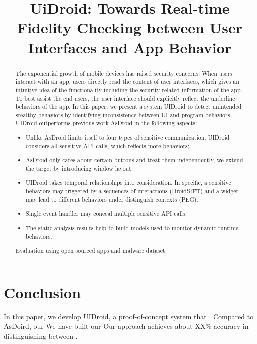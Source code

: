 \documentclass[10pt, conference, letterpaper]{IEEEtran}
\begin{document}
\title{UiDroid: Towards Real-time Fidelity Checking between User Interfaces and App Behavior}

\maketitle


\begin{abstract}
The exponential growth of mobile devices has raised security concerns.
When users interact with an app, users directly read the content of user interfaces, which gives an intuitive idea of the functionality including the security-related information of the app.
To best assist the end users, the user interface should explicitly reflect the underline behaviors of the app.  
In this paper, we present a system UIDroid to detect unintended stealthy behaviors by identifying inconsistence between UI and program behaviors.
UIDroid outperforms previous work AsDroid in the following aspects:
\begin{itemize}
\item Unlike AsDroid limits itself to four types of sensitive communication, UIDroid considers all sensitive API calls, which reflects more behaviors;
\item AsDroid only cares about certain buttons and treat them independently, we extend the target by introducing window layout.
\item UIDroid takes temporal relationships into consideration. In specific, a sensitive behaviors may triggered by a sequences of interactions (DroidSIFT) and a widget may lead to different behaviors under distinguish contexts (PEG);
\item Single event handler may conceal multiple sensitive API calls;
\item The static analysis results help to build models used to monitor dynamic runtime behaviors. 
\end{itemize}
Evaluation using open sourced apps and malware dataset 

        

\end{abstract}







\section{Conclusion}\label{sec:conclusion}
In this paper, we develop UIDroid, a proof-of-concept system that .
Compared to AsDoird, our
We have built our 
Our approach achieves about XX\% accuracy in distinguishing between .



\end{document}

